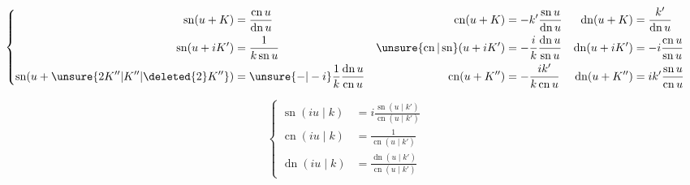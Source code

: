 \[
\left\{\begin{aligned}
\operatorname{sn}(u+K)&=\frac{\operatorname{cn} u}{\operatorname{dn} u}&\operatorname{cn}(u+K)&=-k'\frac{\operatorname{sn} u}{\operatorname{dn} u}&\operatorname{dn}(u+K)&=\frac{k'}{\operatorname{dn} u}\\
\operatorname{sn}(u+iK')&=\frac1{k\operatorname{sn} u}&\unsure{\operatorname{cn}|\operatorname{sn}}(u+iK')&=-\frac ik\frac{\operatorname{dn} u}{\operatorname{sn} u}&\operatorname{dn}(u+iK')&=-i\frac{\operatorname{cn} u}{\operatorname{sn} u}\\
\operatorname{sn}(u+\unsure{2K''|K''|\deleted{2}K''})&=\unsure{-|-i}\frac1k\frac{\operatorname{dn} u}{\operatorname{cn} u}&\operatorname{cn}(u+K'')&=-\frac{ik'}{k\operatorname{cn} u}&\operatorname{dn}(u+K'')&=ik'\frac{\operatorname{sn} u}{\operatorname{cn} u}
\end{aligned}\right.
\]

\[
\left\{\begin{aligned}
\operatorname{sn}(iu\mid k)&=i\frac{\operatorname{sn}(u\mid k')}{\operatorname{cn}(u\mid k')}\\
\operatorname{cn}(iu\mid k)&=\frac1{\operatorname{cn}(u\mid k')}\\
\operatorname{dn}(iu\mid k)&=\frac{\operatorname{dn}(u\mid k')}{\operatorname{cn}(u\mid k')}
\end{aligned}\right.
\]


